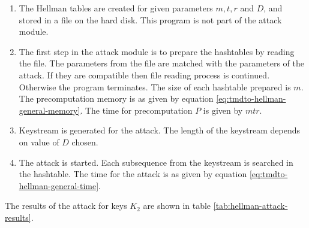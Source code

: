 \begin{enumerate}
\item The Hellman tables are created for given parameters $m,t,r$ and $D$, and stored in a file on the hard disk. This program is not part of the attack module.
\item The first step in the attack module is to prepare the hashtables by reading the file. The parameters from the file are matched with the parameters of the attack. If they are compatible then file reading process is continued. Otherwise the program terminates. The size of each hashtable prepared is $m$. The precomputation memory is as given by equation \ref{eq:tmdto-hellman-general-memory}. The time for precomputation $P$ is given by $mtr$.
\item Keystream is generated for the attack. The length of the keystream depends on value of $D$ chosen.
\item The attack is started. Each subsequence from the keystream is searched in the hashtable. The time for the attack is as given by equation \ref{eq:tmdto-hellman-general-time}. 
\end{enumerate}

The results of the attack for keys $K_2$ are shown in table \ref{tab:hellman-attack-results}. 

